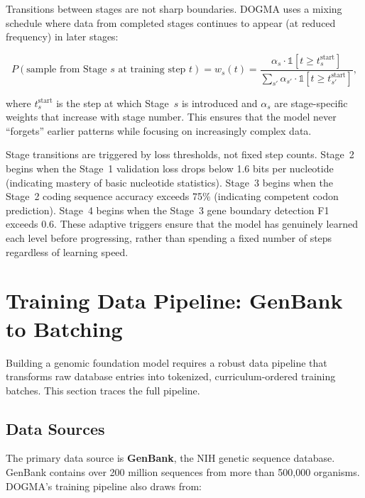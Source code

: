 Transitions between stages are not sharp boundaries. DOGMA uses a mixing schedule where data from completed stages continues to appear (at reduced frequency) in later stages:

\begin{equation}
P(\text{sample from Stage } s \text{ at training step } t) = w_s(t) = \frac{\alpha_s \cdot \mathbb{1}[t \geq t_s^{\text{start}}]}{\sum_{s'} \alpha_{s'} \cdot \mathbb{1}[t \geq t_{s'}^{\text{start}}]},
\label{eq:curriculum-mixing}
\end{equation}

where $t_s^{\text{start}}$ is the step at which Stage~$s$ is introduced and $\alpha_s$ are stage-specific weights that increase with stage number. This ensures that the model never ``forgets'' earlier patterns while focusing on increasingly complex data.

\begin{implnote}
Stage transitions are triggered by loss thresholds, not fixed step counts. Stage~2 begins when the Stage~1 validation loss drops below 1.6 bits per nucleotide (indicating mastery of basic nucleotide statistics). Stage~3 begins when the Stage~2 coding sequence accuracy exceeds 75\% (indicating competent codon prediction). Stage~4 begins when the Stage~3 gene boundary detection F1 exceeds 0.6. These adaptive triggers ensure that the model has genuinely learned each level before progressing, rather than spending a fixed number of steps regardless of learning speed.
\end{implnote}

\section{Training Data Pipeline: GenBank to Batching}
\label{sec:data-pipeline}

Building a genomic foundation model requires a robust data pipeline that transforms raw database entries into tokenized, curriculum-ordered training batches. This section traces the full pipeline.

\subsection{Data Sources}

The primary data source is \textbf{GenBank}, the NIH genetic sequence database. GenBank contains over 200 million sequences from more than 500,000 organisms. DOGMA's training pipeline also draws from:

